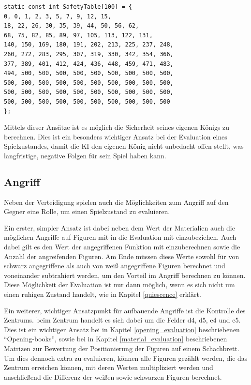 \begin{lstlisting}
static const int SafetyTable[100] = {
0, 0, 1, 2, 3, 5, 7, 9, 12, 15,
18, 22, 26, 30, 35, 39, 44, 50, 56, 62,
68, 75, 82, 85, 89, 97, 105, 113, 122, 131,
140, 150, 169, 180, 191, 202, 213, 225, 237, 248,
260, 272, 283, 295, 307, 319, 330, 342, 354, 366,
377, 389, 401, 412, 424, 436, 448, 459, 471, 483,
494, 500, 500, 500, 500, 500, 500, 500, 500, 500,
500, 500, 500, 500, 500, 500, 500, 500, 500, 500,
500, 500, 500, 500, 500, 500, 500, 500, 500, 500,
500, 500, 500, 500, 500, 500, 500, 500, 500, 500
};
\end{lstlisting}

Mittels dieser Ansätze ist es möglich die Sicherheit seines eigenen Königs zu berechnen. Dies ist ein besonders wichtiger Ansatz bei der Evaluation eines Spielzustandes, damit die KI den eigenen König nicht unbedacht offen stellt, was langfristige, negative Folgen für sein Spiel haben kann. 


\subsection{Angriff}\label{offense_evaluation}

Neben der Verteidigung spielen auch die Möglichkeiten zum Angriff auf den Gegner eine Rolle, um einen Spielzustand zu evaluieren.

Ein erster, simpler Ansatz ist dabei neben dem Wert der Materialien auch die möglichen Angriffe auf Figuren mit in die Evaluation mit einzubeziehen. Auch dabei gilt es den Wert der angegriffenen Funktion mit einzuberechnen sowie die Anzahl der angreifenden Figuren. Am Ende müssen diese Werte sowohl für von schwarz angegriffene als auch von weiß angegriffene Figuren berechnet und voneinander subtrahiert werden, um den Vorteil im Angriff berechnen zu können. Diese Möglichkeit der Evaluation ist nur dann möglich, wenn es sich nicht um einen ruhigen Zustand handelt, wie in Kapitel \ref{quiescence} erklärt. 

Ein weiterer, wichtiger Ansatzpunkt für aufbauende Angriffe ist die Kontrolle des Zentrums. beim Zentrum handelt es sich dabei um die Felder d4, d5, e4 und e5. Dies ist ein wichtiger Ansatz bei in Kapitel \ref{opening_evaluation} beschriebenen ``Opening-books'', sowie bei in Kapitel \ref{material_evaluation} beschriebenen Matrizen zur Bewertung der Positionierung der Figuren auf einem Schachbrett. Um dies dennoch extra zu evaluieren, können alle Figuren gezählt werden, die das Zentrum erreichen können, mit deren Werten multipliziert werden und anschließend die Differenz der weißen sowie schwarzen Figuren berechnet. \cite{O.V.2019}

